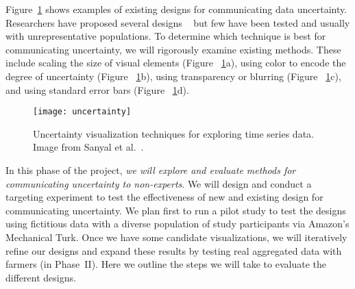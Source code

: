 Figure~\ref{fig:uncertainty} shows examples of existing designs for communicating data uncertainty.
Researchers have proposed several designs ~\cite{brodlie2012review,sanyal2009user,sanyal2010noodles,spiegelhalter2011visualizing} but few have been tested and usually with unrepresentative populations.  
To determine which technique is best for communicating uncertainty, we will rigorously examine existing methods. 
These include scaling the size of visual elements (Figure ~\ref{fig:uncertainty}a), using color to encode the degree of uncertainty (Figure ~\ref{fig:uncertainty}b), using transparency or blurring (Figure ~\ref{fig:uncertainty}c), and using standard error bars (Figure ~\ref{fig:uncertainty}d). 

\begin{figure}[t]
	\centering
	\texttt{[image: uncertainty]}
	\caption{Uncertainty visualization techniques for exploring time series data. Image from Sanyal et al.~\cite{sanyal2009user}.}
	\label{fig:uncertainty}
\end{figure}

In this phase of the project, \emph{we will explore and evaluate methods for communicating uncertainty to non-experts}.
We will design and conduct a targeting experiment to test the effectiveness of new and existing design for communicating uncertainty.   
We plan first to run a pilot study to test the designs using fictitious data with a diverse population of study participants via Amazon's Mechanical Turk. 
Once we have some candidate visualizations, we will iteratively refine our designs and expand these results by testing real aggregated data with farmers (in Phase~II).
Here we outline the steps we will take to evaluate the different designs.   

